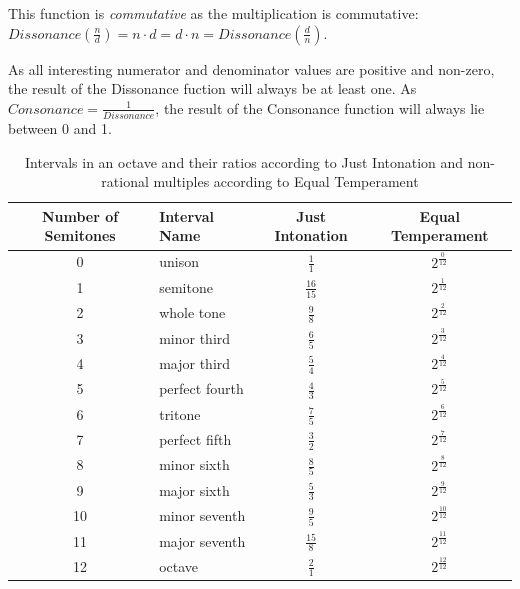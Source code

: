 \documentclass[12pt,a4paper,titlepage,oneside]{report}
\begin{document}
\noindent
{}

This function is \emph{commutative} as the multiplication is commutative: $Dissonance(\frac{n}{d}) = n \cdot d = d \cdot n = Dissonance(\frac{d}{n})$.

As all interesting numerator and denominator values are positive and non-zero, the result of the Dissonance fuction will always be at least one. As $Consonance = \frac{1}{Dissonance}$, the result of the Consonance function will always lie between 0 and 1.

\begin{table}[ht]
\renewcommand*\arraystretch{1.5}
\centering
\begin{tabular}{| c | l | c | c |}
\hline
Number of Semitones & Interval Name  &	Just Intonation & Equal Temperament   \\ \hline
0                   & unison         & $\frac{1}{1}$    & $2^{\frac{0}{12}}$  \\ \hline
1                   & semitone       & $\frac{16}{15}$  & $2^{\frac{1}{12}}$  \\ \hline
2                   & whole tone     & $\frac{9}{8}$    & $2^{\frac{2}{12}}$  \\ \hline
3                   & minor third    & $\frac{6}{5}$    & $2^{\frac{3}{12}}$  \\ \hline
4                   & major third    & $\frac{5}{4}$    & $2^{\frac{4}{12}}$  \\ \hline
5                   & perfect fourth & $\frac{4}{3}$    & $2^{\frac{5}{12}}$  \\ \hline
6                   & tritone        & $\frac{7}{5}$    & $2^{\frac{6}{12}}$  \\ \hline
7                   & perfect fifth  & $\frac{3}{2}$    & $2^{\frac{7}{12}}$  \\ \hline
8                   & minor sixth    & $\frac{8}{5}$    & $2^{\frac{8}{12}}$  \\ \hline
9                   & major sixth    & $\frac{5}{3}$    & $2^{\frac{9}{12}}$  \\ \hline
10                  & minor seventh  & $\frac{9}{5}$    & $2^{\frac{10}{12}}$ \\ \hline
11                  & major seventh  & $\frac{15}{8}$   & $2^{\frac{11}{12}}$ \\ \hline
12                  & octave         & $\frac{2}{1}$    & $2^{\frac{12}{12}}$ \\ \hline
\end{tabular}
\caption{Intervals in an octave and their ratios according to Just Intonation and non-rational multiples according to Equal Temperament}
\label{tab:intervals}
\end{table}
\end{document}
